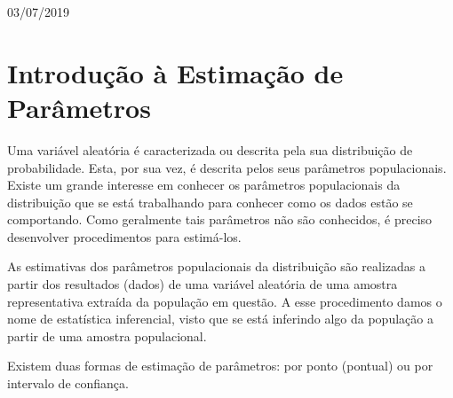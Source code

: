 \begin{titlepage}


{\large 03/07/2019}\\[2cm] %


 

\vfill %

\end{titlepage}


\section{Introdução à Estimação de Parâmetros}

Uma variável aleatória é caracterizada ou descrita pela sua distribuição de probabilidade. Esta, por sua vez, é descrita pelos seus parâmetros populacionais. Existe um grande interesse em conhecer os parâmetros populacionais da distribuição que se está trabalhando para conhecer como os dados estão se comportando. Como geralmente tais parâmetros não são conhecidos, é preciso desenvolver procedimentos para estimá-los. 
 
As estimativas dos parâmetros populacionais da distribuição são realizadas a partir dos resultados (dados) de uma variável aleatória de uma amostra representativa extraída da população em questão. A esse procedimento damos o nome de estatística inferencial, visto que se está inferindo algo da população a partir de uma amostra populacional.

Existem duas formas de estimação de parâmetros: por ponto (pontual) ou por intervalo de confiança. 

